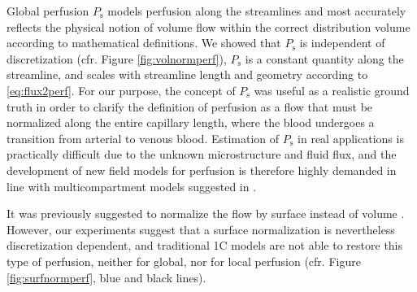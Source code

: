 \documentclass[final,5p,times,twocolumn]{elsarticle}
\begin{document}


	Global perfusion $P_{\mathrm{s}}$ models perfusion along the streamlines and most accurately reflects the physical notion of volume flow within the correct distribution volume according to mathematical definitions. We showed that $P_{\mathrm{s}}$ is independent of discretization (cfr. Figure \ref{fig:volnormperf}), $P_{\mathrm{s}}$ is a constant quantity along the streamline, and scales with streamline length and geometry according to \eqref{eq:flux2perf}.
	For our purpose, the concept of $P_{\mathrm{s}}$ was useful as a realistic ground truth in order to clarify the definition of perfusion as a flow that must be normalized along the entire capillary length, where the blood undergoes a transition from arterial to venous blood. Estimation of $P_{\mathrm{s}}$ in real applications is practically difficult due to the unknown microstructure and fluid flux, and the development of new field models for perfusion is therefore highly demanded in line with multicompartment models suggested in \cite{sourbron14,Michler2013}. 
	

It was previously suggested to normalize the flow by surface instead of volume \cite{Guibert2013}. However, our experiments suggest that a surface normalization is nevertheless discretization dependent, and traditional 1C models are not able to restore this type of perfusion, neither for global, nor for local perfusion (cfr. Figure \ref{fig:surfnormperf}, blue and black lines).
\end{document}
